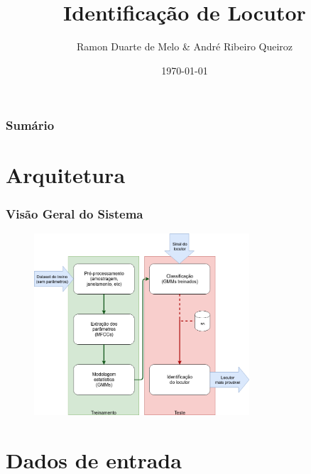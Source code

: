 \documentclass{beamer}
\title[Identificação de Locutor]{Identificação de Locutor} %
\author{Ramon Duarte de Melo \& André Ribeiro Queiroz} %
\institute[UFRJ] %
{
    Universidade Federal do Rio de Janeiro \\ %
    \medskip
    \textit{ramonduarte@poli.ufrj.br \& handre\_queiroz@poli.ufrj.br} \\ %
    \bigskip
    Código e apresentação disponíveis em: \texttt{https://github.com/ramonduarte/procvoz}
    
    }
\date{\today} %
\begin{document}
\begin{frame} %
    \titlepage %
\end{frame}

\begin{frame} %
    \frametitle{Sumário} %
    \tableofcontents 
\end{frame}



\section{Arquitetura}


\begin{frame} %
    \frametitle{Visão Geral do Sistema}

    \begin{figure}
        \centering
        \includegraphics[height=192pt]{fig2.png}
    \end{figure}


\end{frame}


\section{Dados de entrada}
\end{document}
